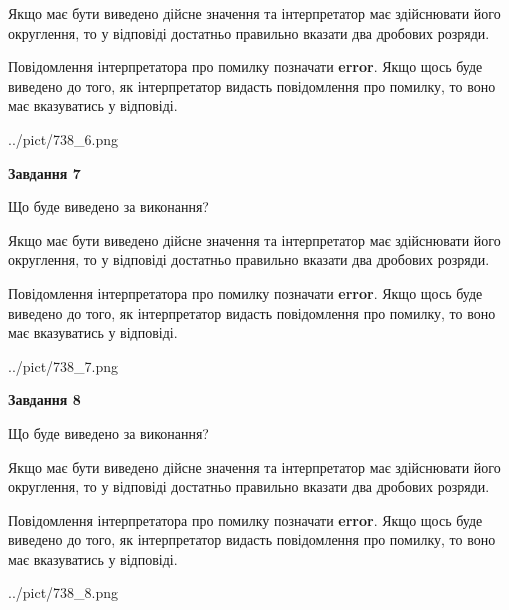 \documentclass[12pt, ukrainian]{article}
\begin{document}
{\begin {Large}
Якщо має бути виведено дійсне значення та інтерпретатор має здійснювати його округлення, 
то у відповіді достатньо правильно вказати два дробових розряди.

Повідомлення інтерпретатора про помилку позначати \textbf{error}.
Якщо щось буде виведено до того, як інтерпретатор видасть повідомлення про помилку, 
то воно має вказуватись у відповіді. \par

\begin{center}
	{../pict/738_6.png}
\end{center}
\newpage

{\begin {center}\textbf{Завдання 7}\end {center}}\par
Що буде виведено за виконання? \par

Якщо має бути виведено дійсне значення та інтерпретатор має здійснювати його округлення, 
то у відповіді достатньо правильно вказати два дробових розряди.

Повідомлення інтерпретатора про помилку позначати \textbf{error}.
Якщо щось буде виведено до того, як інтерпретатор видасть повідомлення про помилку, 
то воно має вказуватись у відповіді. \par

\begin{center}
	{../pict/738_7.png}
\end{center}
\newpage

{\begin {center}\textbf{Завдання 8}\end {center}}\par
Що буде виведено за виконання? \par

Якщо має бути виведено дійсне значення та інтерпретатор має здійснювати його округлення, 
то у відповіді достатньо правильно вказати два дробових розряди.

Повідомлення інтерпретатора про помилку позначати \textbf{error}.
Якщо щось буде виведено до того, як інтерпретатор видасть повідомлення про помилку, 
то воно має вказуватись у відповіді. \par

\begin{center}
	{../pict/738_8.png}
\end{center}
\newpage


\end{Large}}
\end{document}
